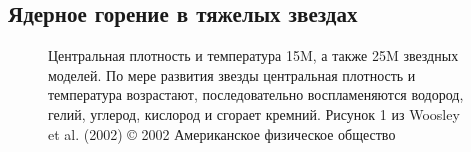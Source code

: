 \documentclass[%
bachelor,    %
natbib,      %
subf,        %
href,        %
colorlinks,  %
]{disser}
\begin{document}
\subsection{Ядерное горение в тяжелых звездах}

\begin{figure}[h]
	\caption{Центральная плотность и температура 15M, а также 25M звездных моделей. По мере развития звезды центральная плотность и температура возрастают, последовательно воспламеняются водород, гелий, углерод, кислород и сгорает кремний. Рисунок 1 из Woosley et al. (2002) © 2002 Американское физическое общество}
	\label{ris:4}
\end{figure}
\end{document}

